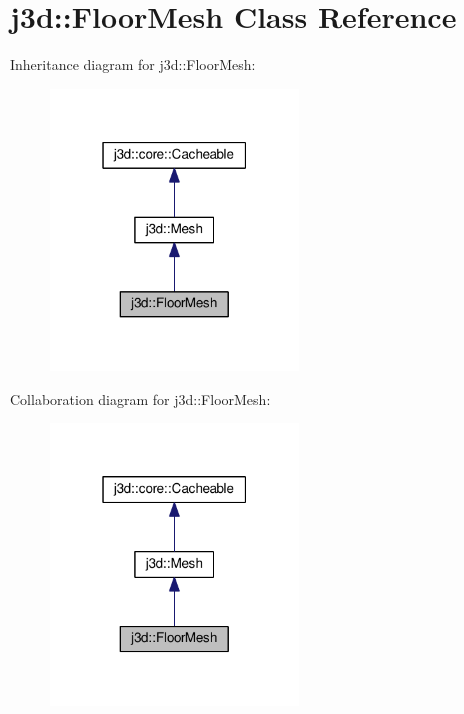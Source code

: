 \hypertarget{classj3d_1_1FloorMesh}{}\section{j3d\+:\+:Floor\+Mesh Class Reference}
\label{classj3d_1_1FloorMesh}


Inheritance diagram for j3d\+:\+:Floor\+Mesh\+:
\nopagebreak
\begin{figure}[H]
\begin{center}
\leavevmode
\includegraphics[width=187pt]{classj3d_1_1FloorMesh__inherit__graph}
\end{center}
\end{figure}


Collaboration diagram for j3d\+:\+:Floor\+Mesh\+:
\nopagebreak
\begin{figure}[H]
\begin{center}
\leavevmode
\includegraphics[width=187pt]{classj3d_1_1FloorMesh__coll__graph}
\end{center}
\end{figure}
